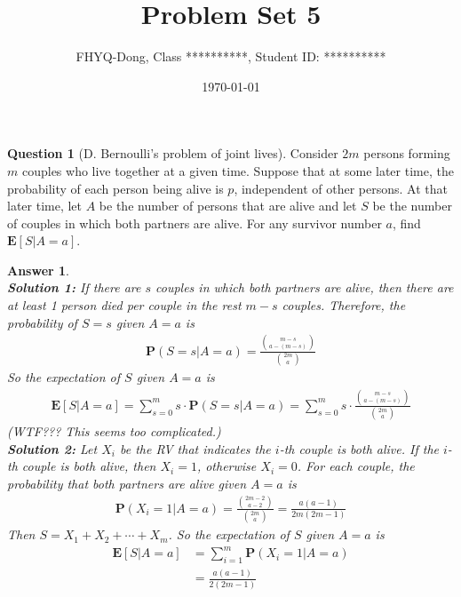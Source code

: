 \documentclass[utf8]{article}
\title{Problem Set 5}
\author{ FHYQ-Dong, Class **********, Student ID: ********** }
\date{\today}
\theoremstyle{definition}%
\newtheorem{question}{Question} %
\theoremstyle{plain}%
\newtheorem{answer}{Answer} %
\begin{document}
\maketitle
\thispagestyle{fancy}


\begin{question}[D. Bernoulli's problem of joint lives]
    Consider $2m$ persons forming $m$ couples who live together at a given time. Suppose that at some later time, the probability of each person being alive is $p$, independent of other persons. At that later time, let $A$ be the number of persons that are alive and let $S$ be the number of couples in which both partners are alive. For any survivor number $a$, find $\mathbf{E}[S | A = a]$.
\end{question}
\begin{answer} ~ \\ 
    \textbf{Solution 1:} 
    If there are $s$ couples in which both partners are alive, then there are at least 1 person died per couple in the rest $m - s$ couples. Therefore, the probability of $S = s$ given $A = a$ is
    \begin{align}
        \mathbf{P}(S = s | A = a) = \frac{\binom{m-s}{a-(m-s)}}{\binom{2m}{a}}
    \end{align}
    So the expectation of $S$ given $A = a$ is
    \begin{align}
        \mathbf{E}[S | A = a] = \sum_{s=0}^{m} s \cdot \mathbf{P}(S = s | A = a) = \sum_{s=0}^{m} s \cdot \frac{\binom{m-s}{a-(m-s)}}{\binom{2m}{a}}
    \end{align}
    (WTF??? This seems too complicated.) \\
    \textbf{Solution 2:} 
    Let $X_i$ be the RV that indicates the $i$-th couple is both alive. If the $i$-th couple is both alive, then $X_i = 1$, otherwise $X_i = 0$. For each couple, the probability that both partners are alive given $A = a$ is
    \begin{align}
        \mathbf{P}(X_i = 1 | A = a) = \frac{\binom{2m-2}{a-2}}{\binom{2m}{a}} = \frac{a(a-1)}{2m(2m-1)}
    \end{align}
    Then $S = X_1 + X_2 + \cdots + X_m$. So the expectation of $S$ given $A = a$ is
    \begin{equation}
    \begin{aligned}
        \mathbf{E}[S | A = a] &= \sum_{i=1}^m \mathbf{\text{P}}(X_i = 1 | A = a) \\ 
        &= \frac{a(a-1)}{2(2m-1)}
    \end{aligned}
    \end{equation}
\end{answer}
\end{document}
